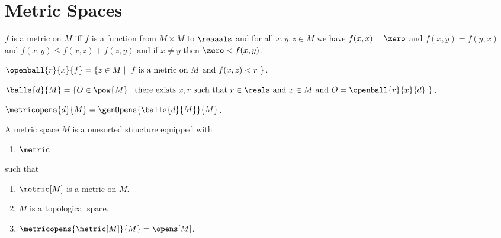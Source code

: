 





\section{Metric Spaces}

\begin{definition}\label{metric}
    $f$ is a metric on $M$ iff $f$ is a function from $M \times M$ to $\reaaals$ and
    for all $x,y,z \in M$ we have 
        $f(x,x) = \zero$ and 
        $f(x,y) = f(y,x)$ and
        $f(x,y) \leq f(x,z) + f(z,y)$ and
        if $x \neq y$ then $\zero < f(x,y)$.
\end{definition}

\begin{definition}\label{open_ball}
    $\openball{r}{x}{f} = \{z \in M \mid \text{ $f$ is a metric on $M$ and $f(x,z) < r$ } \}$.
\end{definition}



\begin{definition}\label{set_of_balls}
    $\balls{d}{M} = \{ O \in \pow{M} \mid \text{there exists $x,r$ such that $r \in \reals$ and $x \in M$ and $O = \openball{r}{x}{d}$ } \}$.
\end{definition}


\begin{definition}\label{metricopens}
    $\metricopens{d}{M} = \genOpens{\balls{d}{M}}{M}$.
\end{definition}







\begin{struct}\label{metric_space}  
    A metric space $M$ is a onesorted structure equipped with
    \begin{enumerate}
        \item $\metric$
    \end{enumerate}
    such that
    \begin{enumerate}
        \item \label{metric_space_metric}                   $\metric[M]$ is a metric on $M$.
        \item \label{metric_space_topology}                 $M$ is a topological space.
        \item \label{metric_space_opens}                    $\metricopens{ \metric[M] }{M} = \opens[M]$.
    \end{enumerate}
\end{struct}

